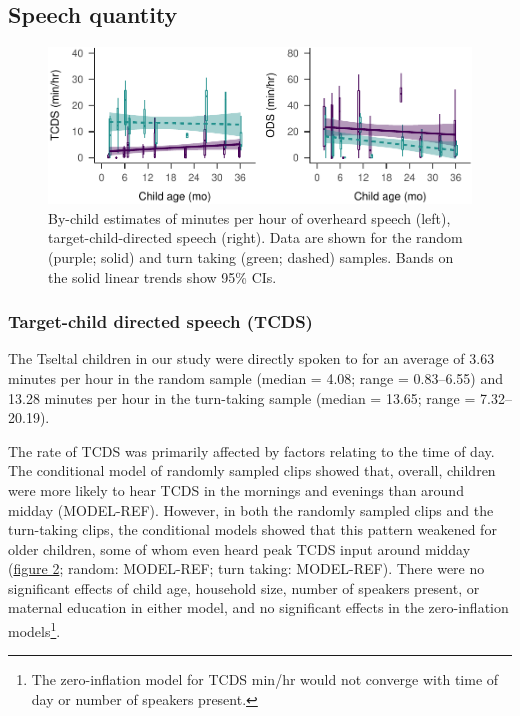 \documentclass[floatsintext,man]{apa6}
\theoremstyle{definition}
\theoremstyle{definition}
\theoremstyle{definition}
\theoremstyle{remark}
\begin{document}
\subsection{Speech quantity}\label{speech-quantity}

\begin{figure}
\centering
\includegraphics{Tseltal-CLE_files/figure-latex/fig1-1.pdf}
\caption{\label{fig:fig1}By-child estimates of minutes per hour of overheard
speech (left), target-child-directed speech (right). Data are shown for
the random (purple; solid) and turn taking (green; dashed) samples.
Bands on the solid linear trends show 95\% CIs.}
\end{figure}

\subsubsection{Target-child directed speech
(TCDS)}\label{target-child-directed-speech-tcds}

The Tseltal children in our study were directly spoken to for an average
of 3.63 minutes per hour in the random sample (median = 4.08; range =
0.83--6.55) and 13.28 minutes per hour in the turn-taking sample (median
= 13.65; range = 7.32--20.19).

The rate of TCDS was primarily affected by factors relating to the time
of day. The conditional model of randomly sampled clips showed that,
overall, children were more likely to hear TCDS in the mornings and
evenings than around midday (MODEL-REF). However, in both the randomly
sampled clips and the turn-taking clips, the conditional models showed
that this pattern weakened for older children, some of whom even heard
peak TCDS input around midday (\protect\hyperlink{fig2}{figure 2};
random: MODEL-REF; turn taking: MODEL-REF). There were no significant
effects of child age, household size, number of speakers present, or
maternal education in either model, and no significant effects in the
zero-inflation
models\footnote{The zero-inflation model for TCDS min/hr would not converge with time of day or number of speakers present.}.
\end{document}
